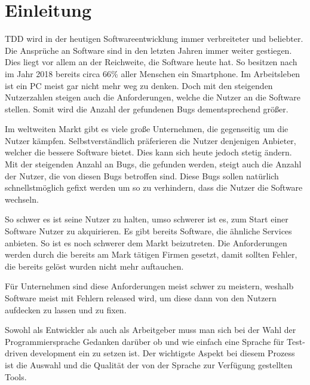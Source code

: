 \section{Einleitung}\label{einleitung}

TDD wird in der heutigen Softwareentwicklung immer verbreiteter und beliebter.
Die Ansprüche an Software sind in den letzten Jahren immer weiter gestiegen. Dies
liegt vor allem an der Reichweite, die Software heute hat. So besitzen nach \cite{FraukeSchobelt:Smartphone}
im Jahr 2018 bereits circa 66\% aller Menschen ein Smartphone. Im Arbeitsleben
ist ein PC meist gar nicht mehr weg zu denken. Doch mit den steigenden
Nutzerzahlen steigen auch die Anforderungen, welche die Nutzer an die Software stellen.
Somit wird die Anzahl der gefundenen Bugs dementsprechend größer.

Im weltweiten Markt gibt es viele große Unternehmen, die gegenseitig um die
Nutzer kämpfen. Selbstverständlich präferieren die Nutzer denjenigen Anbieter, welcher die bessere
Software bietet. Dies kann sich heute jedoch stetig ändern. Mit der steigenden Anzahl
an Bugs, die gefunden werden, steigt auch die Anzahl der Nutzer, die von diesen Bugs betroffen
sind. Diese Bugs sollen natürlich schnellstmöglich gefixt werden um so zu verhindern,
dass die Nutzer die Software wechseln.

So schwer es ist seine Nutzer zu halten, umso schwerer ist es, zum Start einer Software
Nutzer zu akquirieren. Es gibt bereits Software, die ähnliche Services anbieten.
So ist es noch schwerer dem Markt beizutreten. Die Anforderungen werden durch die
bereits am Mark tätigen Firmen gesetzt, damit sollten Fehler, die bereits gelöst
wurden nicht mehr auftauchen.

Für Unternehmen sind diese Anforderungen meist schwer zu meistern, weshalb Software
meist mit Fehlern released wird, um diese dann von den Nutzern aufdecken zu lassen und
zu fixen.

Sowohl als Entwickler als auch als Arbeitgeber muss man sich bei der Wahl der
Programmiersprache Gedanken darüber ob und wie einfach eine Sprache für
Test-driven development ein zu setzen ist. Der wichtigste Aspekt bei diesem
Prozess ist die Auswahl und die Qualität der von der Sprache zur Verfügung
gestellten Tools.



